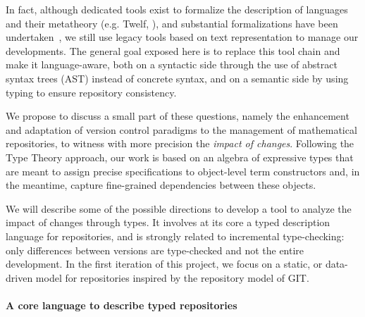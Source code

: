 \documentclass{article}
\newcommand{\remplan}[1]{\noindent\textcolor{bwblue}{$\triangleright$ \textbf{#1}}}
\newcommand{\remtext}[1]{\textcolor{bwgreen}{$\triangleright$ \textsl{#1}}}
\renewcommand{\remplan}[1]{}
\renewcommand{\remtext}[1]{}
\begin{document}
In fact, although dedicated tools exist to formalize the description
of languages and their metatheory (e.g. \textsf{Twelf},
{\citep{pfenning1999system}}), and substantial formalizations have been
undertaken~\citep{lee07}, we still use legacy tools based on text
representation to manage our developments. The general goal exposed
here is to replace this tool chain and make it language-aware, both on
a syntactic side through the use of abstract syntax trees (AST) instead of
concrete syntax, and on a semantic side by using typing to ensure 
repository consistency.



We propose to discuss a small part of these questions, namely the
enhancement and adaptation of version control paradigms to the
management of mathematical repositories, to witness with more
precision the \emph{impact of changes}. Following the Type Theory
approach, our work is based on an algebra of expressive types that are
meant to assign precise specifications to object-level term
constructors and, in the meantime, capture fine-grained
dependencies between these objects.


We will describe some of the possible directions to develop a tool to
analyze the impact of changes through types. It involves at its core a
typed description language for repositories, and is strongly related
to incremental type-checking: only differences between versions are
type-checked and not the entire development. In the first iteration of
this project, we focus on a static, or data-driven model for
repositories inspired by the repository model of \textsf{GIT}.

\paragraph{A core language to describe typed repositories}
\end{document}
